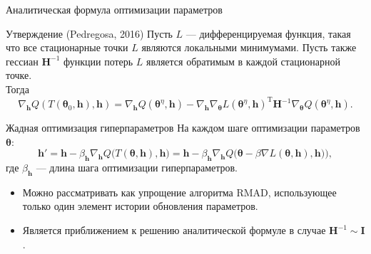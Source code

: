 \documentclass[10pt,pdf,utf8,russian,aspectratio=169]{beamer}
\begin{document}
\begin{frame}{Аналитическая формула оптимизации параметров}
\begin{block}{Утверждение (Pedregosa, 2016)}
Пусть $L$ --- дифференцируемая функция, такая что все стационарные точки $L$ являются локальными минимумами.
Пусть также гессиан $\mathbf{H}^{-1}$ функции потерь $L$ является обратимым в каждой стационарной точке.\\
Тогда
\[
\nabla_{\mathbf{h}}Q(T(\boldsymbol{\theta}_0, \mathbf{h}), \mathbf{h}) =  \nabla_{\mathbf{h}}Q(\boldsymbol{\theta}^\eta, \mathbf{h}) - \nabla_{\mathbf{h}}\nabla_{\boldsymbol{\theta}} L(\boldsymbol{\theta}^\eta, \mathbf{h})^\text{T}\mathbf{H}^{-1}\nabla_{\boldsymbol{\theta}}Q(\boldsymbol{\theta}^\eta, \mathbf{h}).
\]
\end{block}
\end{frame}


\begin{frame}{Жадная оптимизация гиперпараметров}
На каждом шаге оптимизации параметров $\boldsymbol{\theta}$:
\[
	\mathbf{h}' = \mathbf{h} - \beta_{\mathbf{h}} \nabla_{\mathbf{h}}  Q \bigl(T(\boldsymbol{\theta}, \mathbf{h}) , \mathbf{h}\bigr) = \mathbf{h} - \beta_{\mathbf{h}} \nabla_{\mathbf{h}}  Q\bigl(\boldsymbol{\theta} - \beta \nabla L(\boldsymbol{\theta}, \mathbf{h}), \mathbf{h})\bigr),
\]
где $\beta_{\mathbf{h}}$ --- длина шага оптимизации гиперпараметров.

\begin{itemize}
\item Можно рассматривать как упрощение алгоритма RMAD, использующее только один элемент истории обновления параметров.
\item Является приближением к решению аналитической формуле в случае $\mathbf{H}^{-1} \sim \mathbf{I}$.
\end{itemize}

\end{frame}
\end{document}
